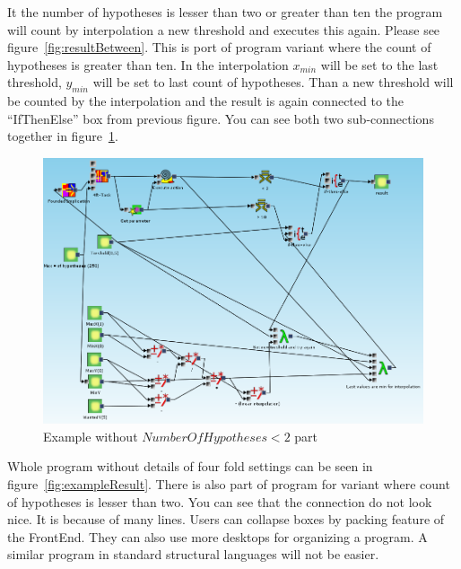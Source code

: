 \documentclass[a4paper,12pt]{book}
\begin{document}
It the number of hypotheses is lesser than two or greater than ten the program will count by interpolation a new threshold and executes this again. Please see figure~\ref{fig:resultBetween}. This is port of program variant where the count of hypotheses is greater than ten. In the interpolation $x_{min}$ will be set to the last threshold, $y_{min}$ will be set to last count of hypotheses. Than a new threshold will be counted by the interpolation and the result is again connected to the ``IfThenElse'' box from previous figure. You can see both two sub-connections together in figure~\ref{fig:exampleWithoutInterpolationOnMax}.

\begin{figure}
	\includegraphics[width=1\textwidth]{exampleWithoutInterpolationOnMax}
	\caption{Example without $NumberOfHypotheses < 2$ part}
	\label{fig:exampleWithoutInterpolationOnMax}
\end{figure}

Whole program without details of four fold settings can be seen in figure~\ref{fig:exampleResult}. There is also part of program for variant where count of hypotheses is lesser than two. You can see that the connection do not look nice. It is because of many lines. Users can collapse boxes by packing feature of the FrontEnd. They can also use more desktops for organizing a program. A similar program in standard structural languages will not be easier.
\end{document}
